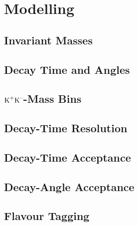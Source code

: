 \section{Modelling}
\label{sec:ana_model}

\subsection{Invariant Masses}
\label{subsec:ana_model_mass}

\subsection{Decay Time and Angles}
\label{subsec:ana_model_timeAngles}

\subsection{\texorpdfstring{$\text{K}^\text{+}\text{K}^\text{--}$}{KK}-Mass Bins}
\label{subsec:ana_model_KKBins}

\subsection{Decay-Time Resolution}
\label{subsec:ana_model_timeRes}

\subsection{Decay-Time Acceptance}
\label{subsec:ana_model_timeAcc}

\subsection{Decay-Angle Acceptance}
\label{subsec:ana_model_angleAcc}

\subsection{Flavour Tagging}
\label{subsec:ana_model_tagging}

